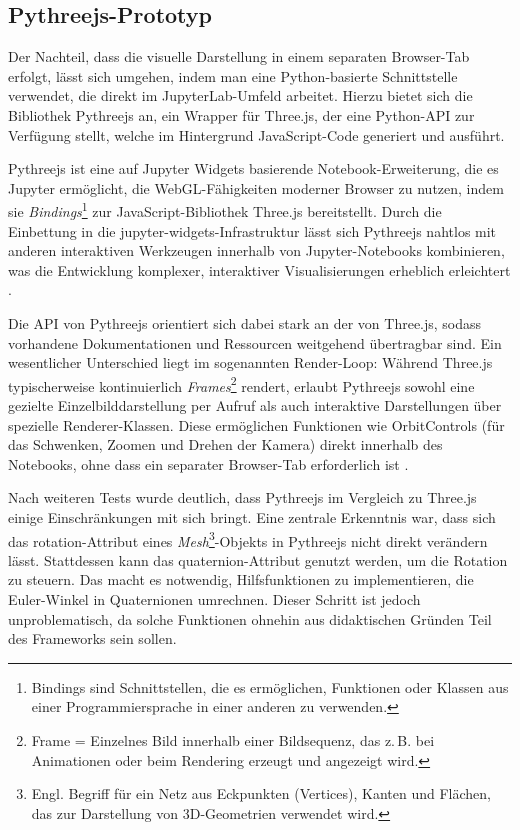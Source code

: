 \subsection{Pythreejs-Prototyp}
Der Nachteil, dass die visuelle Darstellung in einem separaten Browser-Tab erfolgt,
lässt sich umgehen, indem man eine Python-basierte Schnittstelle verwendet, die direkt im JupyterLab-Umfeld arbeitet.
Hierzu bietet sich die Bibliothek Pythreejs an, ein Wrapper für Three.js, der eine Python-API zur Verfügung stellt,
welche im Hintergrund JavaScript-Code generiert und ausführt.

Pythreejs ist eine auf Jupyter Widgets basierende Notebook-Erweiterung,
die es Jupyter ermöglicht, die WebGL-Fähigkeiten moderner Browser zu nutzen, indem sie \textit{Bindings}\footnote{Bindings sind Schnittstellen, die es ermöglichen,
Funktionen oder Klassen aus einer Programmiersprache in einer anderen zu verwenden.} zur JavaScript-Bibliothek Three.js bereitstellt.
Durch die Einbettung in die jupyter-widgets-Infrastruktur lässt sich Pythreejs nahtlos mit anderen interaktiven Werkzeugen innerhalb von Jupyter-Notebooks kombinieren,
was die Entwicklung komplexer, interaktiver Visualisierungen erheblich erleichtert .

Die API von Pythreejs orientiert sich dabei stark an der von Three.js,
sodass vorhandene Dokumentationen und Ressourcen weitgehend übertragbar sind.
Ein wesentlicher Unterschied liegt im sogenannten Render-Loop: Während Three.js typischerweise kontinuierlich \textit{Frames}\footnote{Frame = Einzelnes Bild innerhalb einer Bildsequenz, das z.\,B. bei Animationen oder beim Rendering erzeugt und angezeigt wird.} rendert,
erlaubt Pythreejs sowohl eine gezielte Einzelbilddarstellung per Aufruf als auch interaktive Darstellungen über spezielle Renderer-Klassen.
Diese ermöglichen Funktionen wie OrbitControls (für das Schwenken, Zoomen und Drehen der Kamera) direkt innerhalb des Notebooks,
ohne dass ein separater Browser-Tab erforderlich ist .

Nach weiteren Tests wurde deutlich, dass Pythreejs im Vergleich zu Three.js einige Einschränkungen mit sich bringt.
Eine zentrale Erkenntnis war, dass sich das rotation-Attribut eines \textit{Mesh}\footnote{Engl. Begriff für ein Netz aus Eckpunkten (Vertices), Kanten und Flächen, das zur Darstellung von 3D-Geometrien verwendet wird.}-Objekts in Pythreejs nicht direkt verändern lässt.
Stattdessen kann das quaternion-Attribut genutzt werden, um die Rotation zu steuern. Das macht es notwendig, Hilfsfunktionen zu implementieren,
die Euler-Winkel in Quaternionen umrechnen. Dieser Schritt ist jedoch unproblematisch, da solche Funktionen ohnehin aus didaktischen Gründen Teil des Frameworks sein sollen.


